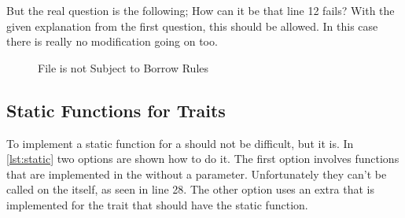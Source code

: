 \documentclass[thesis]{subfiles}
\begin{document}
    But the real question is the following; How can it be that line 12 fails?
    With the given explanation from the first question, this should be allowed.
    In this case there is really no modification going on too.

    \begin{figure}[ht]
      \captionsetup{type=lstlisting}
      
      \caption{File is not Subject to Borrow Rules}\label{lst:rustfile}
    \end{figure}

  \subsection{Static Functions for Traits}
    To implement a static function for a \trait should not be difficult, but it is.
    In \autoref{lst:static} two options are shown how to do it.
    The first option involves functions that are implemented in the \trait without a \self parameter.
    Unfortunately they can't be called on the \trait itself, as seen in line 28.
    The other option uses an extra \trait that is implemented for the trait that should have the static function.

    \newsavebox{\staticOne}
    \begin{lrbox}{\staticOne}
      \begin{minipage}{.47\linewidth}
        
      \end{minipage}
    \end{lrbox}

    \newsavebox{\staticTwo}
    \begin{lrbox}{\staticTwo}
      \begin{minipage}{.45\linewidth}
        
      \end{minipage}
    \end{lrbox}

    \newsavebox{\staticThree}
    \begin{lrbox}{\staticThree}
      
    \end{lrbox}
\end{document}
